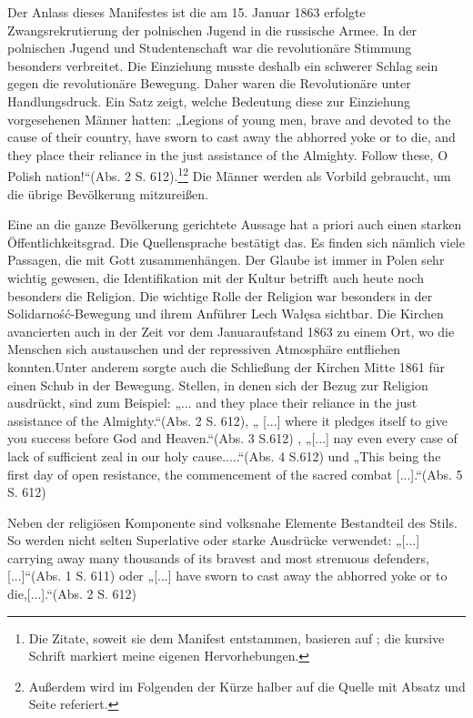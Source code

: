 \documentclass{../../sem_paper}
\begin{document}
Der Anlass dieses Manifestes ist die am 15. Januar 1863 erfolgte Zwangsrekrutierung der
polnischen Jugend in die russische Armee. In der polnischen Jugend und Studentenschaft war die
revolutionäre Stimmung besonders verbreitet. Die Einziehung musste deshalb ein schwerer Schlag
sein gegen die revolutionäre Bewegung. Daher waren die Revolutionäre unter Handlungsdruck. Ein
Satz zeigt, welche Bedeutung diese zur Einziehung vorgesehenen Männer hatten: „Legions of young
men, brave and devoted to the cause of their country, have sworn to cast away the abhorred yoke or
to die, and they place their reliance in the just assistance of the Almighty. Follow these, O Polish
nation!“(Abs. 2 S. 612).\footnote{
Die Zitate, soweit sie dem Manifest entstammen, basieren auf ; 
die kursive Schrift
markiert meine eigenen Hervorhebungen.}\footnote{Außerdem wird im Folgenden der Kürze halber auf die Quelle mit Absatz und Seite referiert.}
Die Männer werden als Vorbild gebraucht, um die übrige Bevölkerung
mitzureißen.

Eine an die ganze Bevölkerung gerichtete Aussage hat a priori auch einen starken
Öffentlichkeitsgrad. Die Quellensprache bestätigt das. Es finden sich nämlich viele Passagen, die
mit Gott zusammenhängen. Der Glaube ist immer in Polen sehr wichtig gewesen, die Identifikation
mit der Kultur betrifft auch heute noch besonders die Religion. Die wichtige Rolle der Religion war
besonders in der Solidarność-Bewegung und ihrem Anführer Lech Wałęsa sichtbar. Die Kirchen
avancierten auch in der Zeit vor dem Januaraufstand 1863 zu einem Ort, wo die Menschen sich
austauschen und der repressiven Atmosphäre entfliehen konnten.Unter anderem sorgte auch die
Schließung der Kirchen Mitte 1861 für einen Schub in der Bewegung. Stellen, in denen sich der
Bezug zur Religion ausdrückt, sind zum Beispiel: „... and they place their reliance in the just
assistance of the Almighty.“(Abs. 2 S. 612), „ [...] where it pledges itself to give you success before
God and Heaven.“(Abs. 3 S.612) , „[...] nay even every case of lack of sufficient zeal in our holy
cause.....“(Abs. 4 S.612) und „This being the first day of open resistance, the commencement of the
sacred combat [...].“(Abs. 5 S. 612)

Neben der religiösen Komponente sind volksnahe Elemente Bestandteil des Stils. So werden nicht
selten Superlative oder starke Ausdrücke verwendet: „[...] carrying away many thousands of its
bravest and most strenuous defenders,[...]“(Abs. 1 S. 611) oder „[...] have sworn to cast away the
abhorred yoke or to die,[...].“(Abs. 2 S. 612)
\end{document}
